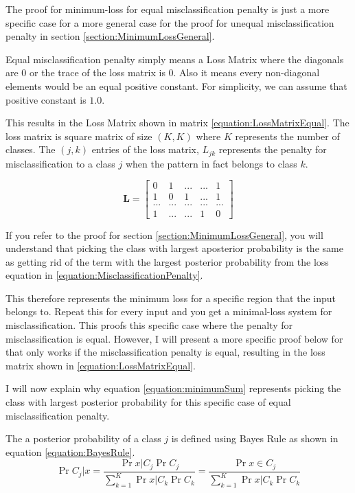 \documentclass[a4paper,12pt]{article}
\begin{document}
The proof for minimum-loss for equal misclassification penalty is just a more specific case for a more general case for the proof for unequal misclassification penalty in section \ref{section:MinimumLossGeneral}. 

Equal misclassification penalty simply means a Loss Matrix where the diagonals are 0 or the trace of the loss matrix is 0. Also it means every non-diagonal elements would be an equal positive constant. For simplicity, we can assume that positive constant is $1.0$. 

This results in the Loss Matrix shown in matrix \ref{equation:LossMatrixEqual}. The loss matrix is square matrix of size $(K,K)$ where $K$ represents the number of classes. 
The $(j,k)$ entries of the loss matrix, $L_{jk}$ represents the penalty for misclassification to a class $j$ when the pattern in fact belongs to class $k$. 

\begin{equation}
\label{equation:LossMatrixEqual}
\mathbf{L} =
  \begin{bmatrix}
    0 & 1 & ... & ... & 1 \\
    1 & 0 & 1 & ... & 1 \\
    ... & ... & ... & ... & ... \\
    1 & ... & ... & 1 & 0
  \end{bmatrix}
\end{equation}

If you refer to the proof for section \ref{section:MinimumLossGeneral}, you will understand that picking the  class with largest aposterior probability is the same as getting rid of the term with the largest posterior probability from the loss equation in \ref{equation:MisclassificationPenalty}.

This therefore represents the minimum loss for a specific region that the input belongs to. Repeat this for every input and you get a minimal-loss system for misclassification. This proofs this specific case where the penalty for misclassification is equal. However, I will present a more specific proof below for that only works if the misclassification penalty is equal, resulting in the loss matrix shown in \ref{equation:LossMatrixEqual}. 

I will now explain why equation \ref{equation:minimumSum} represents picking the class with largest posterior probability for this specific case of equal misclassification penalty. 

The a posterior probability of a class $j$ is defined using Bayes Rule as shown in equation \ref{equation:BayesRule}.
\begin{equation}
\label{equation:BayesRule}
\Pr{C_{j} | x} = \frac{\Pr{x | C_{j}} \Pr{C_{j}}}{\sum_{k=1}^{K}  \Pr{x | C_{k}} \Pr{C_{k}}} = 
\frac{\Pr{x \in C_{j}}}{\sum_{k=1}^{K}  \Pr{x | C_{k}} \Pr{C_{k}}}
\end{equation}
\end{document}
